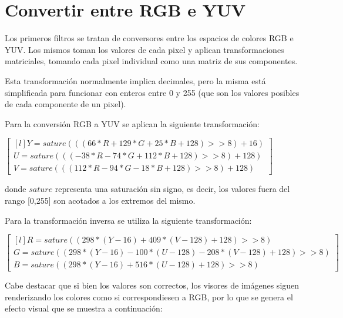 \section{Convertir entre RGB e YUV}

Los primeros filtros se tratan de conversores entre los espacios de colores RGB e YUV. Los mismos toman los valores de cada pixel y aplican transformaciones matriciales, tomando cada pixel individual como una matriz de sus componentes.

Esta transformación normalmente implica decimales, pero la misma está simplificada para funcionar con enteros entre 0 y 255 (que son los valores posibles de cada componente de un pixel).

Para la conversión RGB a YUV se aplican la siguiente transformación:

\begin{center}

	$
	\begin{bmatrix*}[l]
	Y = sature(((66 * R + 129 * G + 25 * B + 128) >> 8) + 16) \\
	U = sature(((-38 * R - 74 * G + 112 * B + 128) >> 8) + 128) \\
	V = sature(((112 * R - 94 * G - 18 * B + 128) >> 8) + 128)
	\end{bmatrix*}
	$

\end{center}

donde $sature$ representa una saturación sin signo, es decir, los valores fuera del rango [0,255] son acotados a los extremos del mismo.

Para la transformación inversa se utiliza la siguiente transformación:

\begin{center}

	$
	\begin{bmatrix*}[l]
	R = sature((298 * (Y - 16) + 409 * (V - 128) + 128) >> 8) \\
	G = sature((298 * (Y - 16) - 100 * (U - 128) - 208 * (V - 128) + 128) >> 8) \\
	B = sature((298 * (Y - 16) + 516 * (U - 128) + 128) >> 8)
	\end{bmatrix*}
	$

\end{center}

Cabe destacar que si bien los valores son correctos, los visores de imágenes siguen renderizando los colores como si correspondiesen a RGB, por lo que se genera el efecto visual que se muestra a continuación:


